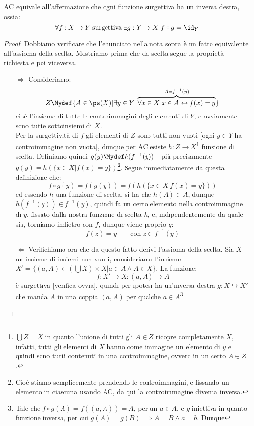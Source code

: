 \documentclass[11pt]{scrartcl}
\begin{document}
\begin{note}
	AC equivale all'affermazione che ogni funzione surgettiva ha un inversa destra, ossia:
	\[ \forall f : X \rightarrow Y \; \text{surgettiva}\;\exists g : Y \rightarrow X \; f \circ g = \id_Y
		\]
\end{note}

\begin{proof}
	Dobbiamo verificare che l'enunciato nella nota sopra è un fatto equivalente all'assioma della scelta. Mostriamo prima che da scelta segue la proprietà richiesta e poi viceversa.
	\begin{itemize}
		\item[$\boxed{\Longrightarrow}$] Consideriamo:
		\[ Z \Mydef \{A \in \ps(X) | \exists y \in Y \; \overbrace{\forall x \in X \; x \in A \leftrightarrow f(x) = y}^{A = f^{-1}(y)}\}
			\]
		cioè l'insieme di tutte le controimmagini degli elementi di $Y$, e ovviamente sono tutte sottoinsiemi di $X$.\\
		Per la surgettività di $f$ gli elementi di $Z$ sono tutti non vuoti [ogni $y \in Y$ ha controimmagine non vuota], dunque per \hyperref[ax9]{AC} esiste $h : Z \rightarrow X$\footnote{$\bigcup Z  = X$ in quanto l'unione di tutti gli $A \in Z$ ricopre completamente $X$, infatti, tutti gli elementi di $X$ hanno
		come immagine un elemento di $y$ e quindi sono tutti contenuti in una controimmagine, ovvero in un certo $A \in Z$.} funzione di scelta. Definiamo quindi $g(y) \Mydef h(f^{-1}(y))$ - più precisamente $g(y) = h(\{x \in X | f(x)  = y\})$\footnote{Cioè stiamo semplicemente prendendo le controimmagini, e fissando un elemento in ciascuna usando AC, da qui la controimmagine diventa inversa.}.
		Segue immediatamente da questa definizione che:
		\[ f \circ g(y) = f(g(y)) = f(h(\{x \in X | f(x)  = y\}))
			\]
		ed essendo $h$ una funzione di scelta, si ha che $h(A) \in A$, dunque $h(f^{-1}(y)) \in f^{-1}(y)$, quindi fa un certo elemento nella controimmagine di $y$, fissato dalla nostra funzione di scelta $h$, e, indipendentemente da quale sia, torniamo indietro con $f$, dunque
		viene proprio $y$:
		\[ f(z) = y \qquad \text{con $z \in f^{-1}(y)$}
			\]
		\item[$\boxed{\Longleftarrow}$] Verifichiamo ora che da questo fatto derivi l'assioma della scelta. Sia $X$ un insieme di insiemi non vuoti, consideriamo l'insieme $X' = \{(a,A) \in \left(\bigcup X\right) \times X | a \in A \land A \in X\}$.
		La funzione:
		\[ f : X' \rightarrow X : (a,A) \mapsto A
			\]
		è surgettiva [verifica ovvia], quindi per ipotesi ha un'inversa destra $g : X \hookrightarrow X'$ che manda $A$ in una coppia $(a,A)$ per qualche $a \in A$\footnote{Tale che $f \circ g (A) = f((a,A)) = A$, per un $a \in A$, e $g$ iniettiva in quanto funzione inversa, per cui $g(A) = g(B) \implies A = B \land a = b$. Dunque 
}
\end{itemize}
\end{proof}
\end{document}
